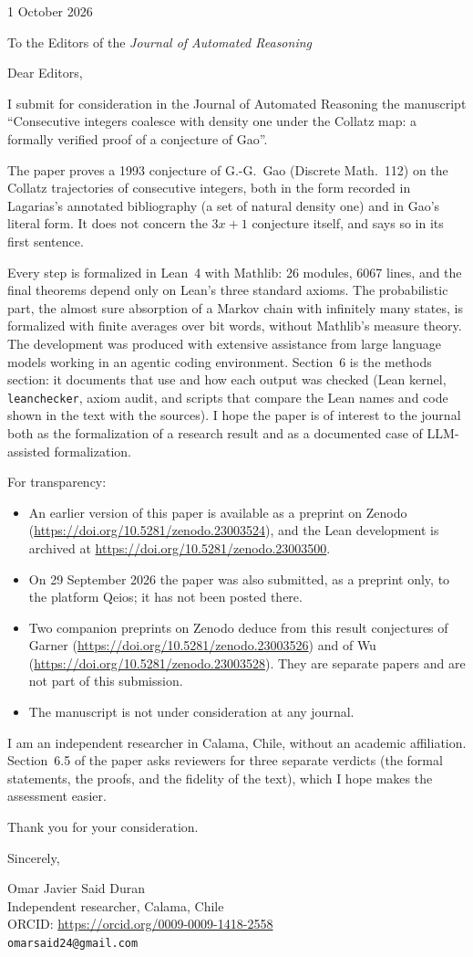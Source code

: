 \documentclass[11pt]{article}
\begin{document}
\hfill 1 October 2026

To the Editors of the \emph{Journal of Automated Reasoning}

Dear Editors,

I submit for consideration in the Journal of Automated Reasoning the manuscript ``Consecutive integers coalesce with density one under the Collatz map: a formally verified proof of a conjecture of Gao''.

The paper proves a 1993 conjecture of G.-G.~Gao (Discrete Math.\ 112) on the Collatz trajectories of consecutive integers, both in the form recorded in Lagarias's annotated bibliography (a set of natural density one) and in Gao's literal form. It does not concern the $3x+1$ conjecture itself, and says so in its first sentence.

Every step is formalized in Lean~4 with Mathlib: 26 modules, 6067 lines, and the final theorems depend only on Lean's three standard axioms. The probabilistic part, the almost sure absorption of a Markov chain with infinitely many states, is formalized with finite averages over bit words, without Mathlib's measure theory. The development was produced with extensive assistance from large language models working in an agentic coding environment. Section~6 is the methods section: it documents that use and how each output was checked (Lean kernel, \texttt{leanchecker}, axiom audit, and scripts that compare the Lean names and code shown in the text with the sources). I hope the paper is of interest to the journal both as the formalization of a research result and as a documented case of LLM-assisted formalization.

For transparency:
\begin{itemize}
\item An earlier version of this paper is available as a preprint on Zenodo (\url{https://doi.org/10.5281/zenodo.23003524}), and the Lean development is archived at \url{https://doi.org/10.5281/zenodo.23003500}.
\item On 29 September 2026 the paper was also submitted, as a preprint only, to the platform Qeios; it has not been posted there.
\item Two companion preprints on Zenodo deduce from this result conjectures of Garner (\url{https://doi.org/10.5281/zenodo.23003526}) and of Wu (\url{https://doi.org/10.5281/zenodo.23003528}). They are separate papers and are not part of this submission.
\item The manuscript is not under consideration at any journal.
\end{itemize}

I am an independent researcher in Calama, Chile, without an academic affiliation. Section~6.5 of the paper asks reviewers for three separate verdicts (the formal statements, the proofs, and the fidelity of the text), which I hope makes the assessment easier.

Thank you for your consideration.

Sincerely,

Omar Javier Said Duran\\
Independent researcher, Calama, Chile\\
ORCID: \url{https://orcid.org/0009-0009-1418-2558}\\
\texttt{omarsaid24@gmail.com}
\end{document}
